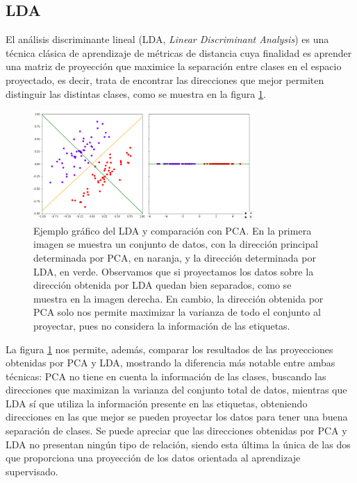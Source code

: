 \documentclass{book}
\begin{document}

\subsection{LDA}

El análisis discriminante lineal (LDA, \emph{Linear Discriminant Analysis}) es una técnica clásica de aprendizaje de métricas de distancia cuya finalidad es aprender una matriz de proyección que maximice la separación entre clases en el espacio proyectado, es decir, trata de encontrar las direcciones que mejor permiten distinguir las distintas clases, como se muestra en la figura \ref{fig:lda}.

\begin{figure}[h]
	\centering
	\includegraphics[width=0.75\textwidth]{./images/lda.png}
	\caption{Ejemplo gráfico del LDA y comparación con PCA. En la primera imagen se muestra un conjunto de datos, con la dirección principal determinada por PCA, en naranja, y la dirección determinada por LDA, en verde. Observamos que si proyectamos los datos sobre la dirección obtenida por LDA quedan bien separados, como se muestra en la imagen derecha. En cambio, la dirección obtenida por PCA solo nos permite maximizar la varianza de todo el conjunto al proyectar, pues no considera la información de las etiquetas.} \label{fig:lda}
\end{figure}


La figura \ref{fig:lda} nos permite, además, comparar los resultados de las proyecciones obtenidas por PCA y LDA, mostrando la diferencia más notable entre ambas técnicas: PCA no tiene en cuenta la información de las clases, buscando las direcciones que maximizan la varianza del conjunto total de datos, mientras que LDA sí que utiliza la información presente en las etiquetas, obteniendo direcciones en las que mejor se pueden proyectar los datos para tener una buena separación de clases. Se puede apreciar que las direcciones obtenidas por PCA y LDA no presentan ningún tipo de relación, siendo esta última la única de las dos que proporciona una proyección de los datos orientada al aprendizaje supervisado. 
\end{document}
